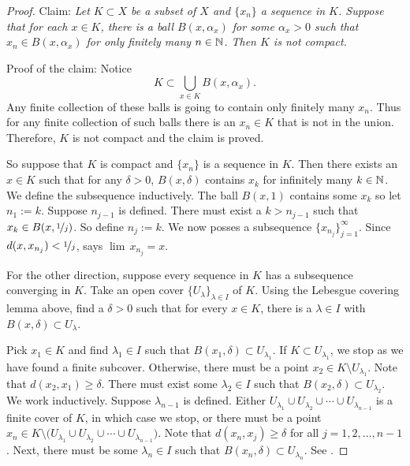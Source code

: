 \begin{proof}
Claim: \emph{Let $K \subset X$ be a subset of $X$ and
$\{ x_n \}$ a sequence in $K$.  Suppose that for each $x \in K$,
there is a ball $B(x,\alpha_x)$ for some $\alpha_x > 0$ such that
$x_n \in B(x,\alpha_x)$ for only finitely many $n \in {\mathbb{N}}$.
Then $K$ is not compact.}

Proof of the claim:
Notice
\begin{equation*}
K \subset \bigcup_{x \in K} B(x,\alpha_x) .
\end{equation*}
Any finite collection of these balls is going to contain only finitely many
$x_n$.  Thus for any finite collection of such balls there is an $x_n \in K$
that is not in the union.  Therefore, $K$ is not compact and the claim is
proved.

So suppose that $K$ is compact and $\{ x_n \}$ is a sequence in $K$.
Then there exists an $x \in K$ such that
for any $\delta > 0$,
$B(x,\delta)$ contains $x_k$ for infinitely many $k \in {\mathbb{N}}$.
We define the subsequence inductively.
The ball $B(x,1)$ contains some $x_k$ so let $n_1 := k$.
Suppose $n_{j-1}$ is defined.
There must exist a $k > n_{j-1}$
such that $x_k \in B(x,\nicefrac{1}{j})$.  So define
$n_j := k$.
We now posses a subsequence $\{ x_{n_j} \}_{j=1}^\infty$.
Since
$d(x,x_{n_j}) < \nicefrac{1}{j}$,   says
$\lim\, x_{n_j} = x$.

For the other direction, suppose every sequence in $K$
has a 
subsequence converging in $K$.
Take
an open cover $\{ U_\lambda \}_{\lambda \in I}$ of $K$.
Using the Lebesgue covering lemma above, find a $\delta > 0$
such that for every $x \in K$, there is a $\lambda \in I$ with
$B(x,\delta) \subset U_\lambda$.

Pick $x_1 \in K$ and find $\lambda_1 \in I$ such that $B(x_1,\delta) \subset
U_{\lambda_1}$.
If $K \subset U_{\lambda_1}$, we stop as we have found a
finite subcover.
Otherwise, there must be
a point $x_2 \in K \setminus U_{\lambda_1}$.
Note that $d(x_2,x_1) \geq \delta$.
There must exist some $\lambda_2 \in I$ such that
$B(x_2,\delta) \subset U_{\lambda_2}$.
We work inductively.  Suppose $\lambda_{n-1}$ is defined.
Either
$U_{\lambda_1} \cup
U_{\lambda_2} \cup \cdots \cup
U_{\lambda_{n-1}}$ is a finite cover of $K$, in which case we
stop, or
there must be 
a point $x_n \in K \setminus \bigl( U_{\lambda_1} \cup
U_{\lambda_2} \cup \cdots \cup
U_{\lambda_{n-1}}\bigr)$.
Note that $d(x_n,x_j) \geq \delta$ for all $j = 1,2,\ldots,n-1$.
Next, there must be some $\lambda_n \in I$
such that $B(x_n,\delta) \subset U_{\lambda_n}$.
See .


\end{proof}
